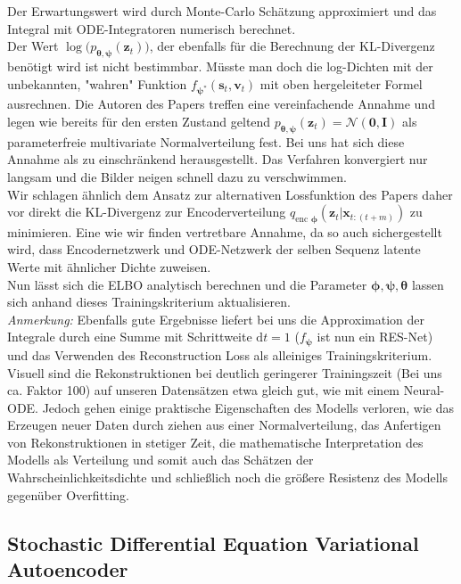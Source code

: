 \documentclass[12pt]{article}
\begin{document}
	Der Erwartungswert wird durch Monte-Carlo Schätzung approximiert und das Integral mit ODE-Integratoren numerisch berechnet.\\
	Der Wert
	$\log\big(p_{\boldsymbol\theta,\boldsymbol\psi}(\mathbf{z}_{t}) \big)$, der ebenfalls für die Berechnung der KL-Divergenz benötigt wird ist nicht bestimmbar. Müsste man doch die log-Dichten mit der unbekannten, "wahren" Funktion $f_{\boldsymbol\psi^{*}}(\mathbf{s}_{t},\mathbf{v}_{t})$ mit oben hergeleiteter Formel ausrechnen.
	Die Autoren des Papers treffen eine vereinfachende Annahme und legen wie bereits für den ersten Zustand geltend $p_{\boldsymbol\theta,\boldsymbol\psi}(\mathbf{z}_{t}) = \mathcal{N}(\mathbf{0},\mathbf{I})$ als parameterfreie multivariate Normalverteilung fest.
	Bei uns hat sich diese Annahme als zu einschränkend herausgestellt. Das Verfahren konvergiert nur langsam und die Bilder neigen schnell dazu zu verschwimmen. \\
	Wir schlagen ähnlich dem Ansatz zur alternativen Lossfunktion des Papers daher vor direkt die KL-Divergenz zur Encoderverteilung $q_{\text{enc }\boldsymbol\phi}(\mathbf{z}_{t}|\mathbf{x}_{t:(t+m)})$ zu minimieren. Eine wie wir finden vertretbare Annahme, da so auch sichergestellt wird, dass Encodernetzwerk und ODE-Netzwerk der selben Sequenz latente Werte mit ähnlicher Dichte zuweisen.\\
	Nun lässt sich die ELBO analytisch berechnen und die Parameter $\boldsymbol\phi,\boldsymbol\psi,\boldsymbol\theta$ lassen sich anhand dieses Trainingskriterium aktualisieren.\\
	
	\emph{Anmerkung:} Ebenfalls gute Ergebnisse liefert bei uns die Approximation der Integrale durch eine Summe mit Schrittweite $\mathrm{d}t=1$ ($f_{\boldsymbol\psi}$ ist nun ein RES-Net) und das Verwenden des Reconstruction Loss als alleiniges Trainingskriterium. Visuell sind die Rekonstruktionen bei deutlich geringerer Trainingszeit (Bei uns ca. Faktor 100) auf unseren Datensätzen etwa gleich gut, wie mit einem Neural-ODE. Jedoch gehen einige praktische Eigenschaften des Modells verloren, wie das Erzeugen neuer Daten durch ziehen aus einer Normalverteilung, das Anfertigen von Rekonstruktionen in stetiger Zeit, die mathematische Interpretation des Modells als Verteilung und somit auch das Schätzen der Wahrscheinlichkeitsdichte und schließlich noch die größere Resistenz des Modells gegenüber Overfitting.
	
	
	\subsection[SDE-VAE]{Stochastic Differential Equation Variational Autoencoder}
	
\end{document}
